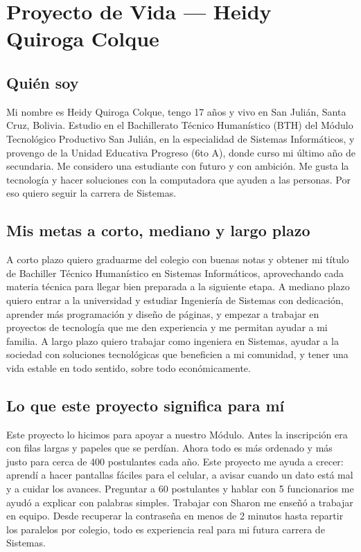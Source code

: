 \section*{Proyecto de Vida --- Heidy Quiroga Colque}

\subsection*{Quién soy}
Mi nombre es Heidy Quiroga Colque, tengo 17 años y vivo en San Julián, Santa Cruz, Bolivia. Estudio en el Bachillerato Técnico Humanístico (BTH) del Módulo Tecnológico Productivo San Julián, en la especialidad de Sistemas Informáticos, y provengo de la Unidad Educativa Progreso (6to A), donde curso mi último año de secundaria. Me considero una estudiante con futuro y con ambición. Me gusta la tecnología y hacer soluciones con la computadora que ayuden a las personas. Por eso quiero seguir la carrera de Sistemas.

\subsection*{Mis metas a corto, mediano y largo plazo}
A corto plazo quiero graduarme del colegio con buenas notas y obtener mi título de Bachiller Técnico Humanístico en Sistemas Informáticos, aprovechando cada materia técnica para llegar bien preparada a la siguiente etapa. A mediano plazo quiero entrar a la universidad y estudiar Ingeniería de Sistemas con dedicación, aprender más programación y diseño de páginas, y empezar a trabajar en proyectos de tecnología que me den experiencia y me permitan ayudar a mi familia. A largo plazo quiero trabajar como ingeniera en Sistemas, ayudar a la sociedad con soluciones tecnológicas que beneficien a mi comunidad, y tener una vida estable en todo sentido, sobre todo económicamente.

\subsection*{Lo que este proyecto significa para mí}
Este proyecto lo hicimos para apoyar a nuestro Módulo. Antes la inscripción era con filas largas y papeles que se perdían. Ahora todo es más ordenado y más justo para cerca de 400 postulantes cada año. Este proyecto me ayuda a crecer: aprendí a hacer pantallas fáciles para el celular, a avisar cuando un dato está mal y a cuidar los avances. Preguntar a 60 postulantes y hablar con 5 funcionarios me ayudó a explicar con palabras simples. Trabajar con Sharon me enseñó a trabajar en equipo. Desde recuperar la contraseña en menos de 2 minutos hasta repartir los paralelos por colegio, todo es experiencia real para mi futura carrera de Sistemas.
